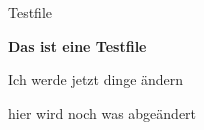 \documentclass[10pt,a4paper]{article}
\begin{document}
\caption{Testfile}

\textbf{Das ist eine Testfile}

Ich werde jetzt dinge ändern


hier wird noch was abgeändert
\end{document}
